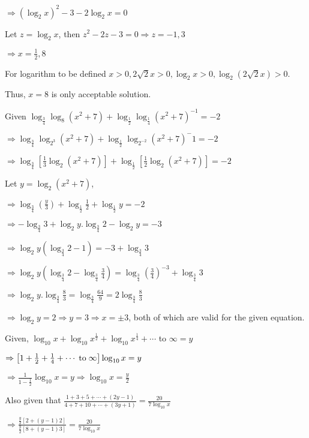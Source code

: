   $\Rightarrow (\log_2x)^2 - 3 - 2\log_2x = 0$

  Let $z = \log_2x$, then $z^2 - 2z - 3 = 0 \Rightarrow z = -1, 3$

  $\Rightarrow x = \frac{1}{2}, 8$

  For logarithm to be defined $x > 0, 2\sqrt{2}x > 0,\log_2x > 0, \log_2(2\sqrt{2}x) > 0$.

  Thus, $x = 8$ is only acceptable solution.
\item  Given $\log_{\tfrac{3}{4}}\log_8(x^2 + 7) + \log_{\tfrac{1}{2}}\log_{\tfrac{1}{4}}(x^2 + 7)^{-1} = -2$

  $\Rightarrow \log_{\tfrac{3}{4}}\log_{2^3}(x^2 + 7) + \log_{\tfrac{1}{2}}\log_{2^{-2}}(x^2 + 7)^-1 = -2$

  $\Rightarrow \log_{\tfrac{3}{4}}\left[\frac{1}{3}\log_2(x^2 + 7)\right] + \log_{\tfrac{1}{2}}\left[\frac{1}{2}\log_2(x^2 + 7)\right] = -2$

  Let $y = \log_2(x^2 + 7)$,

  $\Rightarrow \log_{\tfrac{3}{4}}\left(\frac{y}{3}\right) + \log_{\tfrac{1}{2}}\tfrac{1}{2} + \log_{\tfrac{1}{2}}y = -2$

  $\Rightarrow -\log_{\tfrac{3}{4}}3 + \log_2y.\log_{\tfrac{3}{4}}2 - \log_2y = -3$

  $\Rightarrow \log_2y\left(\log_{\tfrac{3}{4}}2 - 1\right) = -3 + \log_{\tfrac{3}{4}}3$

  $\Rightarrow \log_2y\left(\log_{\tfrac{3}{4}}2 - \log_{\tfrac{3}{4}}\tfrac{3}{4}\right) = \log_{\tfrac{3}{4}}\left(\tfrac{3}{4}\right)^{-3} + \log_{\tfrac{3}{4}}3$

  $\Rightarrow \log_2y.\log_{\tfrac{3}{4}}\tfrac{8}{3} = \log_{\tfrac{3}{4}}\tfrac{64}{9} = 2\log_{\tfrac{3}{4}}\tfrac{8}{3}$

  $\Rightarrow \log_2y = 2 \Rightarrow y = 3 \Rightarrow x = \pm3$, both of which are valid for the given equation.
\item Given, $\log_{10}x + \log_{10}x^{\tfrac{1}{2}} + \log_{10}x^{\tfrac{1}{4}} + \cdots$ to $\infty = y$

  $\Rightarrow \left[1 + \frac{1}{2} + \frac{1}{4} + \cdots\;{\rm to}\;\infty\right]\log_{10}x = y$

  $\Rightarrow \frac{1}{1 - \frac{1}{2}}\log_{10}x = y \Rightarrow \log_{10}x = \frac{y}{2}$

  Also given that $\frac{1 + 3 + 5 + \cdots + (2y - 1)}{4 + 7 + 10 + \cdots + (3y + 1)} = \frac{20}{7\log_{10}x}$

  $\Rightarrow \frac{\frac{y}{2}[2 + (y - 1)2]}{\frac{y}{2}[8 + (y - 1)3]} = \frac{20}{7\log_{10}x}$

